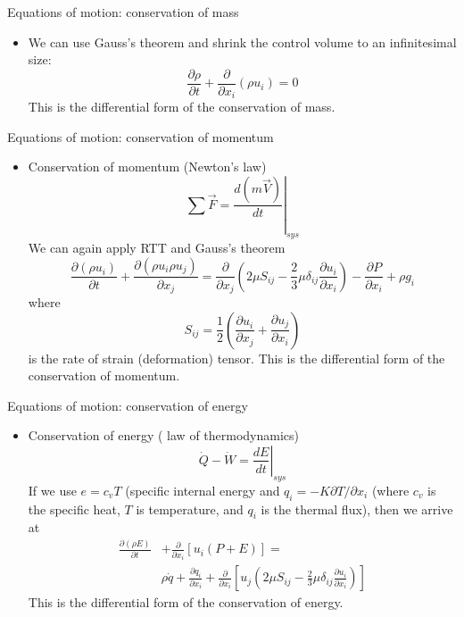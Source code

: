 \begin{frame}{Equations of motion: conservation of mass}

\begin{itemize}
	\item We can use Gauss's theorem and shrink the control volume to an infinitesimal size:
	$$\frac{\partial \rho}{\partial t} + \frac{\partial}{\partial x_i}(\rho u_i) = 0$$
	This is the differential form of the conservation of mass.
\end{itemize}
\end{frame}

\begin{frame}{Equations of motion: conservation of momentum}

\begin{itemize}
	\item Conservation of momentum (Newton's  law)
	$$ \sum \vec{F} = \left.\frac{d(m\vec{V})}{dt}\right|_{sys}$$
	We can again apply RTT and Gauss's theorem
	$$\frac{\partial(\rho u_i)}{\partial t} + \frac{\partial (\rho u_i \rho u_j)}{\partial x_j} = \frac{\partial }{\partial x_j} \left( 2\mu S_{ij} - \frac{2}{3} \mu \delta_{ij} \frac{\partial u_i}{\partial x_i}\right) - \frac{\partial P}{\partial x_i} + \rho g_i$$
	where $$S_{ij} = \frac{1}{2}\left( \frac{\partial u_i}{\partial x_j} + \frac{\partial u_j}{\partial x_i} \right)$$ is the rate of strain (deformation) tensor.\newline\newline
	This is the differential form of the conservation of momentum.
	\end{itemize}
\end{frame}

\begin{frame}{Equations of motion: conservation of energy}

\begin{itemize}
	\item Conservation of energy ( law of thermodynamics)
	$$\dot Q - \dot W = \left.\frac{dE}{dt}\right|_{sys}$$
	If we use $e = c_v T$ (specific internal energy and $q_i = -K \partial T/\partial x_i$ (where $c_v$ is the specific heat, $T$ is temperature, and $q_i$ is the thermal flux), then we arrive at
	\begin{align*}
	\frac{\partial(\rho E)}{\partial t} &+ \frac{\partial}{\partial x_i} \left[u_i(P+E)\right] = \\&\rho \dot q + \frac{\partial q_i}{\partial x_i} + \frac{\partial}{\partial x_i} \left[ u_j \left( 2\mu S_{ij} - \frac{2}{3} \mu \delta_{ij} \frac{\partial u_i}{\partial x_i}\right)\right]
	\end{align*}
	This is the differential form of the conservation of energy.
\end{itemize}
\end{frame}

